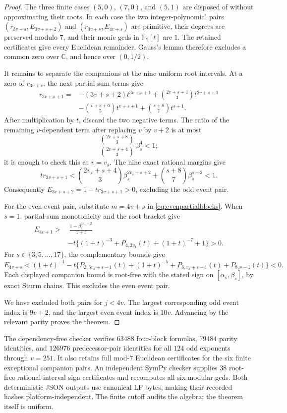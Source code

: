 \documentclass[11pt]{article}
\theoremstyle{remark}
\newcommand{\C}{\mathbb C}
\numberwithin{equation}{section}
\begin{document}
\begin{proof}
The three finite cases $(5,0)$, $(7,0)$, and $(5,1)$ are disposed of without
approximating their roots.  In each case the two integer-polynomial pairs
$(r_{3v+s},E_{3v+s+2})$ and $(r_{3v+s},E_{4v+s})$ are primitive, their degrees
are preserved modulo $7$, and their monic gcds in $\mathbb F_7[t]$ are $1$.
The retained certificates give every Euclidean remainder.  Gauss's lemma
therefore excludes a common zero over $\C$, and hence over $(0,1/2)$.

It remains to separate the companions at the nine uniform root intervals.
At a zero of $r_{3v+s}$, the next partial-sum terms give
\begin{align*}
 r_{3v+s+1}={}&-(3v+s+2)t^{3v+s+1}
 +{2v+s+4\choose3}t^{2v+s+1}\\
 &-{v+s+6\choose5}t^{v+s+1}
 +{s+8\choose7}t^{s+1}.
\end{align*}
After multiplication by $t$, discard the two negative terms.  The ratio of
the remaining $v$-dependent term after replacing $v$ by $v+2$ is at most
\[
 \frac{{2v+s+8\choose3}}{{2v+s+4\choose3}}\,\beta_s^4<1;
\]
it is enough to check this at $v=v_s$.  The nine exact rational margins give
\[
 t r_{3v+s+1}<
 {2v_s+s+4\choose3}\beta_s^{2v_s+s+2}
 +{s+8\choose7}\beta_s^{s+2}<1.
\]
Consequently $E_{3v+s+2}=1-t r_{3v+s+1}>0$, excluding the odd event pair.

For the even event pair, substitute $m=4v+s$ in
\eqref{eq:evenpartialblocks}.  When $s=1$, partial-sum monotonicity and the
root bracket give
\begin{align*}
 E_{4v+1}>&\ \frac{1-\beta_1^{4v_1+2}}{1+t}\\
 &-t\{(1+t)^{-3}+P_{4,2v_1}(t)+(1+t)^{-7}+1\}>0.
\end{align*}
For $s\in\{3,5,\ldots,17\}$, the complementary bounds give
\[
 E_{4v+s}< (1+t)^{-1}
 -t\{P_{2,3v_s+s-1}(t)+(1+t)^{-5}
       +P_{6,v_s+s-1}(t)+P_{8,s-1}(t)\}<0.
\]
Each displayed companion bound is root-free with the stated sign on
$[\alpha_s,\beta_s]$, by exact Sturm chains.  This excludes the even event
pair.

We have excluded both pairs for $j<4v$.  The largest corresponding odd event
index is $9v+2$, and the largest even event index is $10v$.  Advancing by the
relevant parity proves the theorem.
\end{proof}

The dependency-free checker verifies $63488$ four-block formulas, $79484$
parity identities, and $126976$ predecessor-pair identities for all $124$ odd
exponents through $v=251$.  It also retains full mod-$7$ Euclidean
certificates for the six finite exceptional companion pairs.  An independent
SymPy checker supplies $38$ root-free rational-interval sign certificates and
recomputes all six modular gcds.  Both deterministic JSON outputs use
canonical LF bytes, making their recorded hashes platform-independent.  The
finite cutoff audits the algebra; the theorem itself is uniform.
\end{document}
